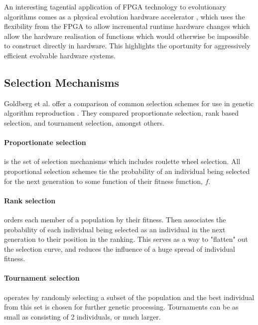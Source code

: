 An interesting tagential application of FPGA technology to evolutionary algorithms comes as
a physical evolution hardware accelerator \cite{1377261}, which uses the flexibility from the
FPGA to allow incremental runtime hardware changes which allow the hardware realisation of
functions which would otherwise be impossible to construct directly in hardware.
This highlights the oportunity for aggressively efficient evolvable hardware
systems.

\subsection{Selection Mechanisms}

Goldberg et al. offer a comparison of common selection schemes for use in genetic
algorithm reproduction \cite{GOLDBERG199169}. They compared proportionate
selection, rank based selection, and tournament selection, amongst others.

\paragraph{Proportionate selection} is the set of selection mechanisms which includes
roulette wheel selection. All proportional selection schemes tie the probability of
an individual being selected for the next generation to some function of their fitness
function, $f$.

\paragraph{Rank selection} orders each member of a population by their
fitness. Then associates the probability of each individual being selected as an
individual in the next generation to their position in the ranking. This serves as
a way to "flatten" out the selection curve, and reduces the influence of
a huge spread of individual fitness.

\paragraph{Tournament selection} operates by randomly selecting a subset of the
population and the best individual from this set is chosen for further genetic
processing. Tournaments can be as small as consisting of 2 individuals, or much
larger.

